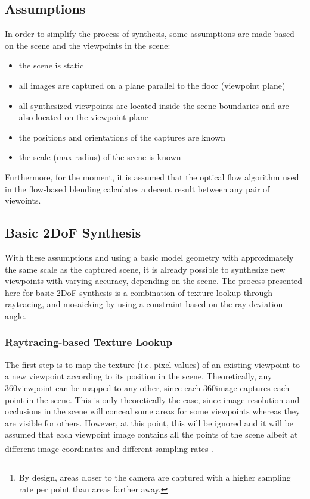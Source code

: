 \subsection{Assumptions}
In order to simplify the process of synthesis, some assumptions are made based on the scene and the viewpoints in the scene:

\begin{itemize}
  \item the scene is static
  \item all images are captured on a plane parallel to the floor (viewpoint plane)
  \item all synthesized viewpoints are located inside the scene boundaries and are also located on the viewpoint plane
  \item the positions and orientations of the captures are known
  \item the scale (max radius) of the scene is known
\end{itemize}

Furthermore, for the moment, it is assumed that the optical flow algorithm used in the flow-based blending calculates a decent result between any pair of viewoints.

\subsection{Basic 2DoF Synthesis} \label{subsec:basic-synthesis}
With these assumptions and using a basic model geometry with approximately the same scale as the captured scene, it is already possible to synthesize new viewpoints with varying accuracy, depending on the scene. The process presented here for basic 2DoF synthesis is a combination of texture lookup through raytracing, and mosaicking by using a constraint based on the ray deviation angle.

\subsubsection{Raytracing-based Texture Lookup}
The first step is to map the texture (i.e. pixel values) of an existing viewpoint to a new viewpoint according to its position in the scene. Theoretically, any 360\degree viewpoint can be mapped to any other, since each 360\degree image captures each point in the scene. This is only theoretically the case, since image resolution and occlusions in the scene will conceal some areas for some viewpoints whereas they are visible for others. However, at this point, this will be ignored and it will be assumed that each viewpoint image contains all the points of the scene albeit at different image coordinates and different sampling rates\footnote{By design, areas closer to the camera are captured with a higher sampling rate per point than areas farther away.}. 

